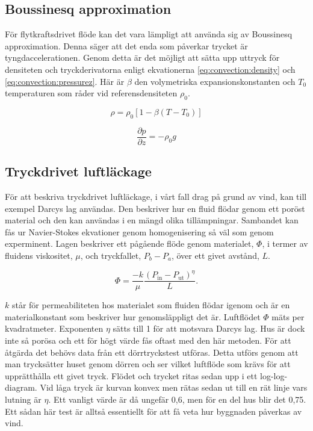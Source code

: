 
\subsection{Boussinesq approximation}

För flytkraftsdrivet flöde kan det vara lämpligt att använda sig av
Boussinesq approximation. Denna säger att det enda som påverkar trycket är
tyngdaccelerationen. Genom detta är det möjligt att sätta upp uttryck för densiteten
och tryckderivatorna enligt ekvationerna \eqref{eq:convection:density}
och \eqref{eq:convection:pressurez}. Här är
$\beta$ den volymetriska expansionskonstanten och
$T_0$ temperaturen som råder vid referensdensiteten $\rho_0$.

\begin{equation}
\label{eq:convection:density}
\rho = \rho_0[1-\beta(T-T_0)]
\end{equation}

\begin{equation}
\label{eq:convection:pressurez}
\frac{\partial p}{\partial z} = -\rho_0g
\end{equation}

\subsection{Tryckdrivet luftläckage}
\label{subsec:darcy}

För att beskriva tryckdrivet luftläckage, i vårt fall drag på grund av vind, kan till exempel Darcys lag användas. Den beskriver hur en fluid flödar genom ett poröst material och den kan användas i en mängd olika tillämpningar. Sambandet kan fås ur Navier-Stokes ekvationer genom homogenisering så väl som genom experminent. Lagen beskriver ett pågående flöde genom materialet, $\Phi$, i termer av fluidens viskositet, $\mu$, och tryckfallet, $P_b - P_a$, över ett givet avstånd, $L$.

\begin{equation}
\Phi=\frac{-k}{\mu} \frac{(P_\text{in} - P_\text{ut})^\eta}{L}.
\end{equation}
    
$k$ står för permeabiliteten hos materialet som fluiden flödar igenom och är en 
materialkonstant som beskriver hur genomsläppligt det är. Luftflödet $\Phi$ mäts per 
kvadratmeter. Exponenten $\eta$ sätts till 1 för att motsvara Darcys lag. Hus är dock inte så
 porösa och ett för högt värde fås oftast med den här metoden. För att åtgärda det behövs 
 data från ett dörrtryckstest utföras. Detta utförs genom att man trycksätter huset genom 
 dörren och ser vilket luftflöde som krävs för att upprätthålla ett givet tryck. Flödet och trycket 
 ritas sedan upp i ett log-log-diagram. Vid låga tryck är kurvan konvex men rätas sedan ut till 
 en rät linje vars lutning är $\eta$. Ett vanligt värde är då ungefär 0,6, men för en del hus blir 
 det 0,75.\cite{sasic} Ett sådan här test är alltså essentiellt för att få veta hur byggnaden 
 påverkas av vind.
 
